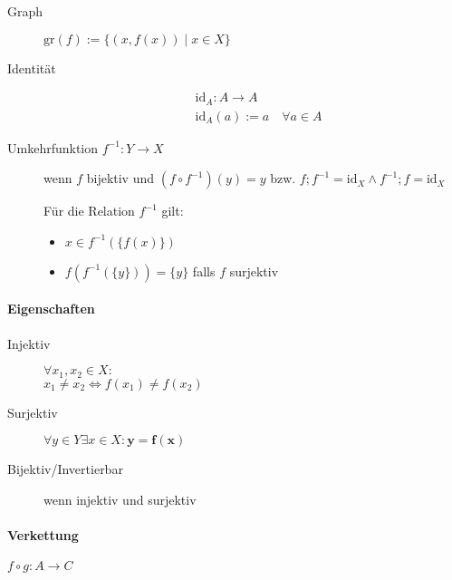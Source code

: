 \begin{description}
  \item [Graph]
        $\text{gr} (f) := \{ (x, f(x)) \mid x \in X \}$

  \item [Identität]
        \begin{align*}
           & \text{id}_A: A \rightarrow A              \\
           & \text{id}_A(a) := a \quad \forall a \in A
        \end{align*}

  \item [Umkehrfunktion $f^{-1}: Y \rightarrow X$]
        wenn $f$ bijektiv und $(f \circ f^{-1}) (y) = y$ bzw. $f;f^{-1} = \text{id}_X \land f^{-1};f = \text{id}_X$

        Für die Relation $f^{-1}$ gilt:

        \begin{itemize}
          \item $x \in f^{-1}(\{ f(x) \})$
          \item $f(f^{-1}(\{ y \})) = \{ y \}$ falls $f$ surjektiv
        \end{itemize}
\end{description}

\paragraph{Eigenschaften}

\begin{mzImportant}
  \begin{description}
    \item [Injektiv]
          $\forall x_1, x_2 \in X:$ \\
          $x_1 \boldsymbol{\neq} x_2 \Leftrightarrow f(x_1) \boldsymbol{\neq} f(x_2)$

    \item [Surjektiv]
          $\forall y \in Y \exists x \in X: \mathbf{y = f(x)}$

    \item [Bijektiv/Invertierbar]
          wenn injektiv und surjektiv
  \end{description}
\end{mzImportant}

\paragraph{Verkettung} $f \circ g: A \rightarrow C$

